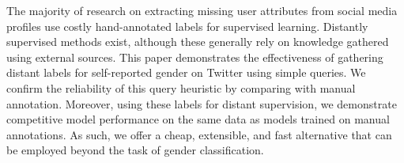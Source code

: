 The majority of research on extracting missing user attributes from social media profiles use costly hand-annotated labels for supervised learning. Distantly supervised methods exist, although these generally rely on knowledge gathered using external sources. This paper demonstrates the effectiveness of gathering distant labels for self-reported gender on Twitter using simple queries. We confirm the reliability of this query heuristic by comparing with manual annotation. Moreover, using these labels for distant supervision, we demonstrate competitive model performance on the same data as models trained on manual annotations. As such, we offer a cheap, extensible, and fast alternative that can be employed beyond the task of gender classification.
